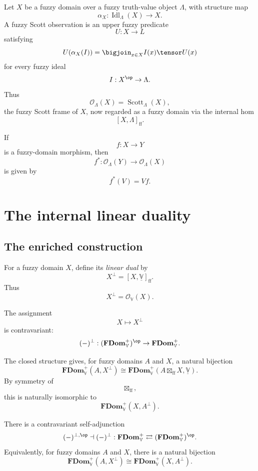 Let \(X\) be a fuzzy domain over a fuzzy truth-value object \(\Lambda\), with
structure map
\[
    \alpha_X:\operatorname{Idl}_{\Lambda}(X)\to X.
\]
A fuzzy Scott observation is an upper fuzzy predicate
\[
    U:X\to L
\]
satisfying
\[
    U(\alpha_X(I))
    =
    \bigjoin_{x\in X}
    I(x)\tensor U(x)
\]
for every fuzzy ideal
\[
    I:X^{\op}\to\Lambda.
\]
Thus
\[
    \mathcal O_{\Lambda}(X)
    =
    \operatorname{Scott}_{\Lambda}(X),
\]
the fuzzy Scott frame of \(X\), now regarded as a fuzzy domain via the internal
hom
\[
    [X,\Lambda]_{\mathrm{ff}}.
\]

If
\[
    f:X\to Y
\]
is a fuzzy-domain morphism, then
\[
    f^\ast:
    \mathcal O_{\Lambda}(Y)\to\mathcal O_{\Lambda}(X)
\]
is given by
\[
    f^\ast(V)=Vf.
\]

\section{The internal linear duality}
\label{sec:internal-linear-duality}

\subsection{The enriched construction}
\label{subsec:internal-linear-duality-enriched}

\begin{definition}
\label{def:fuzzy-domain-linear-dual}
For a fuzzy domain \(X\), define its \emph{linear dual} by
\[
    X^{\perp}
    =
    [X,\underline{\mathbb V}]_{\mathrm{ff}}.
\]
Thus
\[
    X^{\perp}
    =
    \mathcal O_{\mathbb V}(X).
\]
\end{definition}

The assignment
\[
    X\longmapsto X^{\perp}
\]
is contravariant:
\[
    (-)^{\perp}:
    (\mathbf{FDom}_{\mathbb V}^{+})^{\op}
    \to
    \mathbf{FDom}_{\mathbb V}^{+}.
\]

The closed structure gives, for fuzzy domains \(A\) and \(X\), a natural
bijection
\[
    \mathbf{FDom}_{\mathbb V}^{+}
    (A,X^{\perp})
    \cong
    \mathbf{FDom}_{\mathbb V}^{+}
    (A\boxtimes_{\mathrm{ff}}X,\underline{\mathbb V}).
\]
By symmetry of
\[
    \boxtimes_{\mathrm{ff}},
\]
this is naturally isomorphic to
\[
    \mathbf{FDom}_{\mathbb V}^{+}
    (X,A^{\perp}).
\]

\begin{theorem}
\label{thm:linear-duality-adjunction}
There is a contravariant self-adjunction
\[
    (-)^{\perp,\op}
    \dashv
    (-)^{\perp}
    :
    \mathbf{FDom}_{\mathbb V}^{+}
    \rightleftarrows
    (\mathbf{FDom}_{\mathbb V}^{+})^{\op}.
\]
Equivalently, for fuzzy domains \(A\) and \(X\), there is a natural bijection
\[
    \mathbf{FDom}_{\mathbb V}^{+}
    (A,X^{\perp})
    \cong
    \mathbf{FDom}_{\mathbb V}^{+}
    (X,A^{\perp}).
\]
\end{theorem}

